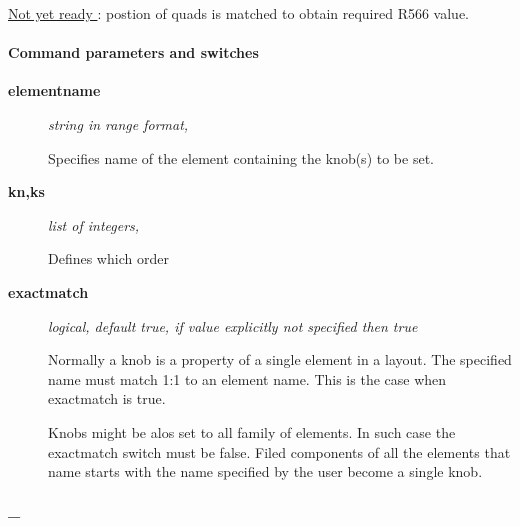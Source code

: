 \href{http://cern.ch/frs/mad-X_examples/ptc_madx_interface/eplacement/chicane.madx}{  Not yet ready } : postion of quads is matched to obtain required R566 value.  

\paragraph{ Command parameters and switches }
\begin{description}
	\item[\textbf{ elementname }] \textit{ string in range format, }

 Specifies name of the element containing the knob(s) to be set.   
	\item[\textbf{ kn,ks }] \textit{ list of integers,   }

 Defines which order    
	\item[\textbf{ exactmatch }] \textit{ logical, default true, if value explicitly not specified then true}

 Normally a knob is a property of a single element in a layout.        The specified name must match 1:1 to an element name. This is the case       when exactmatch is true.      

 Knobs might be alos set to all family of elements. In such case        the exactmatch switch must be false. Filed components of all the elements        that name starts with the name specified by the user become a single knob.          
\end{description}

\paragraph{\_  }



% 
% 
% 
% 


